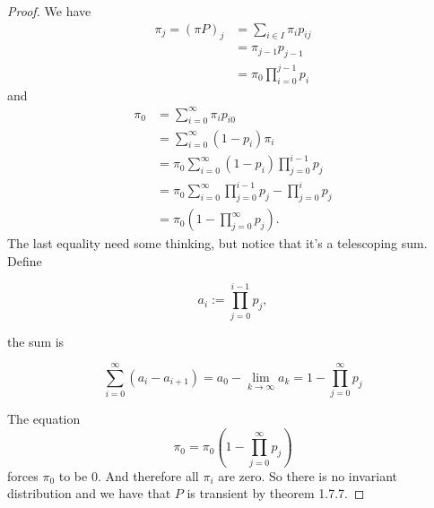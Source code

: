 \begin{proof}
We have
\begin{align*}
\pi _{j}=(\pi P)_{j}&=\sum _{i\in I}\pi _{i}p_{ij} \\
&=\pi _{j-1}p_{j-1}\\
&=\pi _{0}\prod _{i=0}^{j-1}p_{i}
\end{align*}
and
\begin{align*}
\pi _{0}&=\sum _{i=0}^\infty \pi _{i}p_{i0}\\
&=\sum _{i=0}^\infty (1-p_{i})\pi _{i} \\
&=\pi _{0}\sum _{i=0}^\infty (1-p_{i})\prod _{j=0}^{i-1}p_{j} \\
&=\pi _{0}\sum _{i=0}^\infty \prod _{j=0}^{i-1}p_{j}-\prod _{j=0}^{i}p_{j} \\
&=\pi _{0}(1-\prod _{j=0}^{\infty }p_{j}).
\end{align*}
The last equality need some thinking, but notice that it's a telescoping sum. Define

$$a_i := \prod_{j=0}^{i-1} p_j,$$

the sum is

$$\sum_{i=0}^\infty (a_i - a_{i+1}) = a_0 - \lim_{k\to\infty} a_k= 1-\prod _{j=0}^{\infty }p_{j}$$

The equation 
\[\pi _{0}=\pi _{0}(1-\prod _{j=0}^{\infty }p_{j})\]
forces \(\pi _{0}\) to be \(0\). And therefore all \(\pi _{i}\) are zero. So there is no invariant distribution and we have that \(P\) is transient by theorem 1.7.7.
\end{proof}


